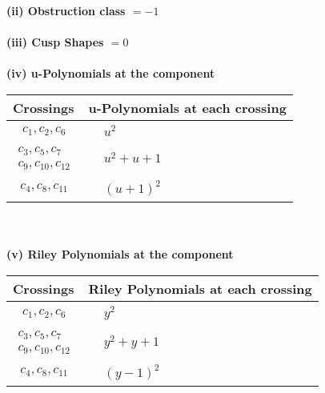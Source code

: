 \documentclass[1p]{elsarticle_modified}
\theoremstyle{definition}
\begin{document}
\flushleft \textbf{(ii) Obstruction class $= -1$}\\~\\
\flushleft \textbf{(iii) Cusp Shapes $= 0$}\\~\\
\newpage\renewcommand{\arraystretch}{1}
\flushleft \textbf{(iv) u-Polynomials at the component}\newline \\
\begin{tabular}{m{50pt}|m{274pt}}
Crossings & \hspace{64pt}u-Polynomials at each crossing \\
\hline $$\begin{aligned}c_{1},c_{2},c_{6}\end{aligned}$$&$\begin{aligned}
&u^2
\end{aligned}$\\
\hline $$\begin{aligned}c_{3},c_{5},c_{7}\\c_{9},c_{10},c_{12}\end{aligned}$$&$\begin{aligned}
&u^2+u+1
\end{aligned}$\\
\hline $$\begin{aligned}c_{4},c_{8},c_{11}\end{aligned}$$&$\begin{aligned}
&(u+1)^2
\end{aligned}$\\
\hline
\end{tabular}\\~\\
\newpage\renewcommand{\arraystretch}{1}
\flushleft \textbf{(v) Riley Polynomials at the component}\newline \\
\begin{tabular}{m{50pt}|m{274pt}}
Crossings & \hspace{64pt}Riley Polynomials at each crossing \\
\hline $$\begin{aligned}c_{1},c_{2},c_{6}\end{aligned}$$&$\begin{aligned}
&y^2
\end{aligned}$\\
\hline $$\begin{aligned}c_{3},c_{5},c_{7}\\c_{9},c_{10},c_{12}\end{aligned}$$&$\begin{aligned}
&y^2+y+1
\end{aligned}$\\
\hline $$\begin{aligned}c_{4},c_{8},c_{11}\end{aligned}$$&$\begin{aligned}
&(y-1)^2
\end{aligned}$\\
\hline
\end{tabular}\\~\\
\end{document}
